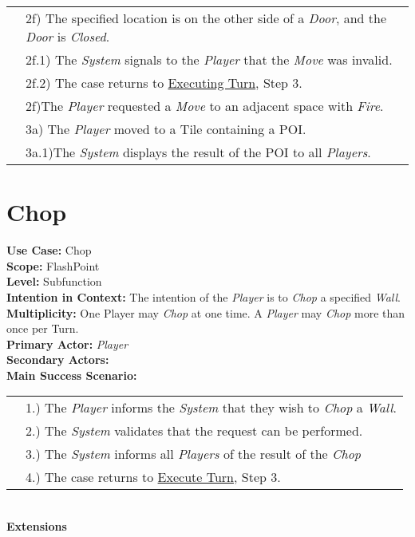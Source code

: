 \documentclass{article}
\begin{document}
\begin{tabular}{l l}
		&2f) The specified location is on the other side of a \textit{Door}, and the \textit{Door} is \textit{Closed}.\\
		&\qquad2f.1) The \textit{System} signals to the \textit{Player} that the \textit{Move} was invalid.\\ 
		&\qquad2f.2) The case returns to \underline{Executing Turn}, Step 3.\\
		&2f)The \textit{Player} requested a \textit{Move} to an adjacent space with \textit{Fire}.\\
		&3a) The \textit{Player} moved to a Tile containing a POI.\\
		&\qquad3a.1)The \textit{System} displays the result of the POI to all \textit{Players}.
	\end{tabular}
	
	
	\section*{Chop}
	\textbf{Use Case:} Chop\\
	\textbf{Scope:} FlashPoint\\
	\textbf{Level:} Subfunction\\
	\textbf{Intention in Context: } The intention of the \textit{Player} is to \textit{Chop} a specified \textit{Wall}.\\
	\textbf{Multiplicity: } One Player may \textit{Chop} at one time. A \textit{Player} may \textit{Chop} more than once per Turn.\\
	\textbf{Primary Actor:} \textit{Player} \\
	\textbf{Secondary Actors:}\\
	\textbf{Main Success Scenario:}\\
	\begin{tabular}{l l}
		&1.) The \textit{Player} informs the \textit{System} that they wish to \textit{Chop} a \textit{Wall}.\\
		&2.) The \textit{System} validates that the request can be performed.\\
		&3.) The \textit{System} informs all \textit{Players} of the result of the \textit{Chop}\\
		&4.) The case returns to \underline{Execute Turn}, Step 3.\\
	\end{tabular}\\
	\textbf{Extensions}\\
\end{document}
